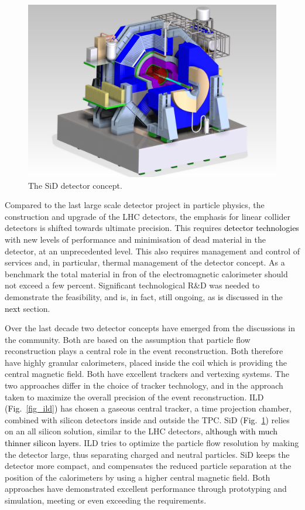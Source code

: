 \documentclass[%
 reprint,
 amsmath,amssymb,
 aps,
]{revtex4-1}
\newcommand{\jim}[1]{\textcolor{black}{#1}}
\def\Fig#1{Fig.~\ref{#1}}
\begin{document}
\begin{figure}[tb]
 \begin{center}
 \includegraphics[width=\hsize]{figures/SiD.pdf}
\caption{The SiD detector concept.
\label{fig_sid}}
 \end{center}
 \end{figure}

Compared to the last large scale detector project in particle physics, the construction and upgrade of the LHC detectors, the emphasis for linear collider detectors is shifted towards ultimate precision. This requires \jim{detector technologies} 
with new levels of performance and minimisation of dead material in the detector, at an unprecedented level. This also requires management and control of services and, in particular, thermal management of the detector concept. As a benchmark the total material in fron of the electromagnetic calorimeter should not exceed a few percent. Significant technological R\&D was needed to demonstrate the feasibility, and is, in fact, still ongoing, as \jim{is} discussed in the \jim{next} section.  



Over the last decade two detector concepts have emerged from the discussions in the community. Both are based on the assumption that particle flow reconstruction plays a central role in the event reconstruction. Both therefore have highly granular calorimeters, placed inside the coil which is providing the central magnetic field. Both have excellent trackers and vertexing systems. The two approaches differ in the choice of tracker technology, and in the approach taken to maximize the overall precision of the event reconstruction. ILD \jim{(\Fig{fig_ild}) } has chosen a gaseous central tracker, a time projection chamber, combined with silicon detectors inside and outside the TPC. SiD \jim{(\Fig{fig_sid}) } relies on an all silicon solution, similar to the LHC detectors, \jim{although with
much thinner silicon layers}. ILD tries to optimize the particle flow resolution by making the detector large, thus separating charged and neutral particles. SiD keeps the detector more compact, and compensates the reduced particle separation at the position of the calorimeters by using a higher central magnetic field. Both approaches have demonstrated excellent performance through prototyping and simulation, meeting or even exceeding the requirements. 
\end{document}

